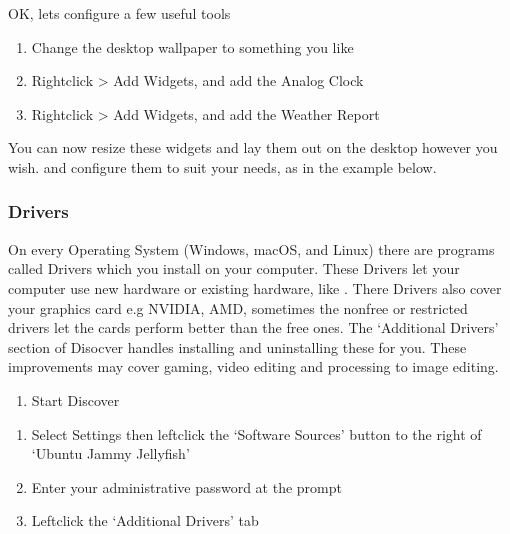 \documentclass[letterpaper,10pt,english]{sphinxmanual}
\begin{document}
\sphinxAtStartPar
OK, lets configure a few useful tools
\begin{enumerate}
%
\item {} 
\sphinxAtStartPar
Change the desktop wallpaper to something you like

\item {} 
\sphinxAtStartPar
Right\sphinxhyphen{}click \textgreater{} Add Widgets, and add the Analog Clock

\item {} 
\sphinxAtStartPar
Right\sphinxhyphen{}click \textgreater{} Add Widgets, and add the Weather Report

\end{enumerate}

\sphinxAtStartPar
You can now resize these widgets and lay them out on the desktop however you wish. and configure them to suit your needs, as in the example below.



\subsubsection{Drivers}
\label{\detokenize{docs/desktop-guide/advanced:drivers}}
\sphinxAtStartPar
On every Operating System (Windows, macOS, and Linux) there are programs called Drivers which you install on your computer. These Drivers let your computer use new hardware or existing hardware, like . There Drivers also cover your graphics card e.g NVIDIA, AMD, sometimes the nonfree or restricted drivers let the cards perform better than the free ones. The ‘Additional Drivers’ section of Disocver handles installing and uninstalling these for you. These improvements may cover gaming, video editing and processing to image editing.
\begin{enumerate}
%
\item {} 
\sphinxAtStartPar
Start Discover

\end{enumerate}

\begin{enumerate}
%
\setcounter{enumi}{1}
\item {} 
\sphinxAtStartPar
Select Settings then left\sphinxhyphen{}click the ‘Software Sources’ button to the right of ‘Ubuntu Jammy Jellyfish’

\item {} 
\sphinxAtStartPar
Enter your administrative password at the prompt

\item {} 
\sphinxAtStartPar
Left\sphinxhyphen{}click the ‘Additional Drivers’ tab

\end{enumerate}
\end{document}
